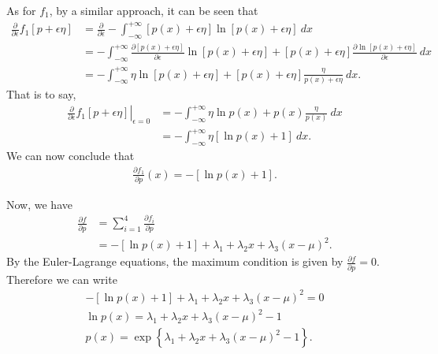 \begin{answer}{}
	As for $f_1$, by a similar approach, it can be seen that
	\begin{align}
		\frac{\partial}{\partial \epsilon} f_1[p + \epsilon\eta] &= \frac{\partial}{\partial \epsilon} - \int_{-\infty}^{+\infty} [p(x) + \epsilon\eta]\ln [p(x) + \epsilon\eta]\ dx\\
		&= - \int_{-\infty}^{+\infty} \frac{\partial [p(x) + \epsilon\eta]}{\partial \epsilon}\ln [p(x) + \epsilon\eta] + [p(x) + \epsilon\eta]\frac{\partial \ln [p(x) + \epsilon\eta]}{\partial \epsilon}\ dx\\
		&= - \int_{-\infty}^{+\infty} \eta \ln [p(x) + \epsilon\eta] + [p(x) + \epsilon\eta]\frac{\eta}{p(x) + \epsilon\eta}\ dx.
	\end{align}
	That is to say,
	\begin{align}
		\left. \frac{\partial}{\partial \epsilon} f_1[p + \epsilon\eta]\right\rvert_{\epsilon = 0} &= - \int_{-\infty}^{+\infty} \eta \ln p(x) + p(x)\frac{\eta}{p(x)}\ dx\\
		&= - \int_{-\infty}^{+\infty} \eta[\ln p(x) + 1]\ dx.
	\end{align}
	We can now conclude that
	\begin{align}
		\frac{\partial f_1}{\partial p}(x) = -[\ln p(x) + 1].
	\end{align}
	
	Now, we have
	\begin{align}
		\frac{\partial f}{\partial p} &= \sum_{i = 1}^{4} \frac{\partial f_i}{\partial p}\\
		&= -[\ln p(x) + 1] + \lambda_1 + \lambda_2 x + \lambda_3(x-\mu)^2.
	\end{align}
	By the Euler-Lagrange equations, the maximum condition is given by $ \frac{\partial f}{\partial p} = 0 $. Therefore we can write
	\begin{gather}
		-[\ln p(x) + 1] + \lambda_1 + \lambda_2 x + \lambda_3(x-\mu)^2 = 0\\
		\ln p(x) = \lambda_1 + \lambda_2 x + \lambda_3(x-\mu)^2 - 1\\
		p(x) = \exp\left\{ \lambda_1 + \lambda_2 x + \lambda_3(x-\mu)^2 - 1 \right\}. \label{1.34eqn3}
	\end{gather}


\end{answer}
